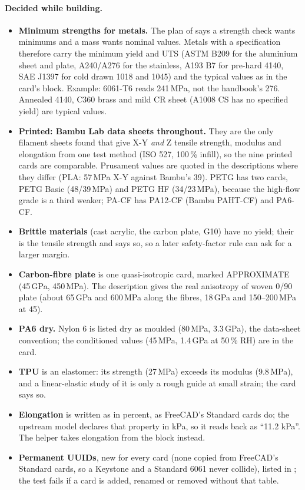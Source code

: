 \paragraph{Decided while building.}
\begin{itemize}[nosep]
  \item \textbf{Minimum strengths for metals.} The plan of  says a strength check wants minimums and a
        mass wants nominal values. Metals with a specification therefore carry the minimum yield and UTS (ASTM B209
        for the aluminium sheet and plate, A240/A276 for the stainless, A193 B7 for pre-hard 4140, SAE J1397 for cold
        drawn 1018 and 1045) and the typical values as  in the card's 
        block. Example: 6061-T6 reads 241\,MPa, not the handbook's 276. Annealed 4140, C360 brass and mild CR sheet
        (A1008 CS has no specified yield) are typical values.
  \item \textbf{Printed: Bambu Lab data sheets throughout.} They are the only filament sheets found that give X-Y
        \emph{and} Z tensile strength, modulus and elongation from one test method (ISO 527, 100\,\% infill), so the
        nine printed cards are comparable. Prusament values are quoted in the descriptions where they differ (PLA:
        57\,MPa X-Y against Bambu's 39). PETG has two cards, PETG Basic (48/39\,MPa) and PETG HF (34/23\,MPa),
        because the high-flow grade is a third weaker; PA-CF has PA12-CF (Bambu PAHT-CF) and PA6-CF.
  \item \textbf{Brittle materials} (cast acrylic, the carbon plate, G10) have no yield; their  is
        the tensile strength and  says so, so a later safety-factor rule can ask for a larger
        margin.
  \item \textbf{Carbon-fibre plate} is one quasi-isotropic card, marked APPROXIMATE (45\,GPa, 450\,MPa). The description
        gives the real anisotropy of woven 0/90 plate (about 65\,GPa and 600\,MPa along the fibres, 18\,GPa and
        150--200\,MPa at 45\textdegree).
  \item \textbf{PA6 dry.} Nylon 6 is listed dry as moulded (80\,MPa, 3.3\,GPa), the data-sheet convention; the
        conditioned values (45\,MPa, 1.4\,GPa at 50\,\% RH) are in the card.
  \item \textbf{TPU} is an elastomer: its strength (27\,MPa) exceeds its modulus (9.8\,MPa), and a linear-elastic study
        of it is only a rough guide at small strain; the card says so.
  \item \textbf{Elongation} is written as  in percent, as FreeCAD's Standard cards do; the upstream
        model declares that property in kPa, so it reads back as ``11.2 kPa''. The helper takes elongation from the
         block instead.
  \item \textbf{Permanent UUIDs}, new for every card (none copied from FreeCAD's Standard cards, so a Keystone and a
        Standard 6061 never collide), listed in ; the test fails if a card is added,
        renamed or removed without that table.
\end{itemize}

